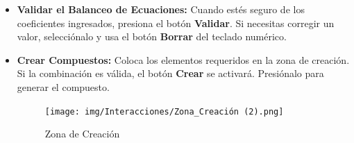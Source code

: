 \begin{itemize}
    \item \textbf{Validar el Balanceo de Ecuaciones:}  
    Cuando estés seguro de los coeficientes ingresados, presiona el botón \textbf{Validar}. Si necesitas corregir un valor, selecciónalo y usa el botón \textbf{Borrar} del teclado numérico.

    \item \textbf{Crear Compuestos:}  
    Coloca los elementos requeridos en la zona de creación. Si la combinación es válida, el botón \textbf{Crear} se activará. Presiónalo para generar el compuesto.

    \begin{figure}[thbp]
        \centering
        \texttt{[image: img/Interacciones/Zona\_Creación (2).png]}
        \caption{Zona de Creación}
        \label{fig:Zona de Creación}
    \end{figure}


\end{itemize}
